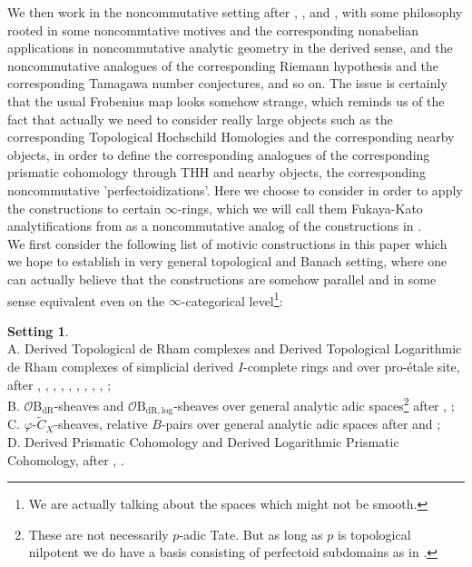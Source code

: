 \documentclass[11pt]{book}
\theoremstyle{definition}
\numberwithin{equation}{section}
\newtheorem{setting}[theorem]{Setting}
\begin{document}
\indent We then work in the noncommutative setting after \cite{Kon1}, \cite{Ta}, \cite{KR1} and \cite{KR2}, with some philosophy rooted in some noncommtative motives and the corresponding nonabelian applications in noncommutative analytic geometry in the derived sense, and the noncommutative analogues of the corresponding Riemann hypothesis and the corresponding Tamagawa number conjectures, and so on. The issue is certainly that the usual Frobenius map looks somehow strange, which reminds us of the fact that actually we need to consider really large objects such as the corresponding Topological Hochschild Homologies and the corresponding nearby objects, in order to define the corresponding analogues of the corresponding prismatic cohomology through THH and nearby objects, the corresponding noncommutative 'perfectoidizations'. Here we choose to consider \cite{12NS} in order to apply the constructions to certain $\infty$-rings, which we will call them Fukaya-Kato analytifications from \cite{12FK} as a noncommutative analog of the constructions in \cite{BBM}.\\


\indent We first consider the following list of motivic constructions in this paper which we hope to establish in very general topological and Banach setting, where one can actually believe that the constructions are somehow parallel and in some sense equivalent even on the $\infty$-categorical level\footnote{We are actually talking about the spaces which might not be smooth.}:

\begin{setting}\mbox{}\\
A. Derived Topological de Rham complexes and Derived Topological Logarithmic de Rham complexes of simplicial derived $I$-complete rings and over pro-\'etale site, after \cite{12B1}, \cite{12B2}, \cite{12Bei}, \cite{12BMS}, \cite{12BS}, \cite{12G1}, \cite{12GL}, \cite{12Ill1}, \cite{12Ill2}, \cite{12O};\\
B. $\mathcal{O}\mathrm{B}_\mathrm{dR}$-sheaves and $\mathcal{O}\mathrm{B}_\mathrm{dR,log}$-sheaves over general analytic adic spaces\footnote{These are not necessarily $p$-adic Tate. But as long as $p$ is topological nilpotent we do have a basis consisting of perfectoid subdomains as in \cite[Theorem 2.9.9, Remark 2.9.10]{12Ked1}.} after \cite{12DLLZ2}, \cite{12Sch2};\\
C. $\varphi$-$\widetilde{C}_X$-sheaves, relative $B$-pairs over general analytic adic spaces after \cite{12KL1} and \cite{12KL2};\\
D. Derived Prismatic Cohomology and Derived Logarithmic Prismatic Cohomology, after \cite{12BS}, \cite{12Ko1}.\\
\end{setting}
\end{document}
